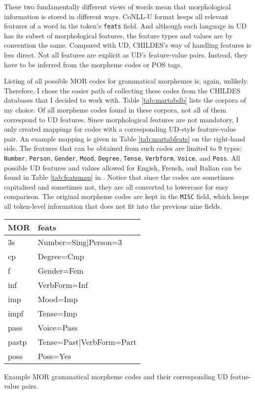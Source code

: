 These two fundamentally different views of words mean that morphological information is stored in different ways. CoNLL-U format keeps all relevant features of a word in the token's \texttt{feats} field. And although each language in UD has its subset of morphological features, the feature types and values are by convention the same. Compared with UD, CHILDES's way of handling features is less direct. Not all features are explicit as UD's feature-value pairs. Instead, they have to be inferred from the morpheme codes or POS tags.

Listing of all possible MOR codes for grammatical morphemes is, again, unlikely. Therefore, I chose the easier path of collecting these codes from the CHILDES databases that I decided to work with. Table \ref{tab:martabdb} lists the corpora of my choice. Of all morpheme codes found in these corpora, not all of them correspond to UD features. Since morphological features are not mandatory, I only created mappings for codes with a corresponding UD-style feature-value pair. An example mapping is given in Table \ref{tab:martabfeats} on the right-hand side. The features that can be obtained from such codes are limited to 9 types: \texttt{Number}, \texttt{Person}, \texttt{Gender}, \texttt{Mood}, \texttt{Degree}, \texttt{Tense}, \texttt{Verbform}, \texttt{Voice}, and \texttt{Poss}. All possible UD features and values allowed for Engish, French, and Italian can be found in Table \ref{tab:featsmap} in . Notice that since the codes are sometimes capitalised and sometimes not, they are all converted to lowercase for easy comparison. The original morpheme codes are kept in the \texttt{MISC} field, which keeps all token-level information that does not fit into the previous nine fields.

\begin{margintable}[1\baselineskip]
\begin{tabularx}{1\textwidth}{@{}ll@{}}
\toprule
\textbf{MOR} & \textbf{feats}\\ \midrule
    3s & Number=Sing|Person=3\\
    cp & Degree=Cmp\\
    f & Gender=Fem\\
    inf & VerbForm=Inf\\
    imp & Mood=Imp\\
    impf & Tense=Imp\\
    pass & Voice=Pass\\
    pastp & Tense=Past|VerbForm=Part\\
    poss & Poss=Yes\\\bottomrule
\end{tabularx}
\caption{\label{tab:martabfeats}Example MOR grammatical morpheme codes and their corresponding UD featue-value pairs.}
\footnotesize
\end{margintable}


